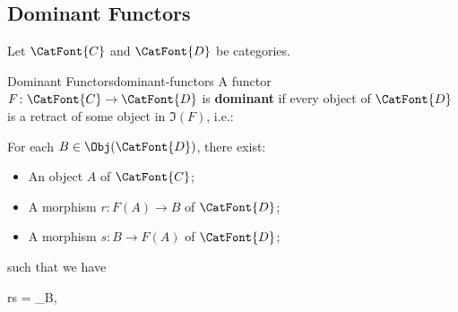 \subsection{Dominant Functors}\label{subsection-dominant-functors}
Let $\CatFont{C}$ and $\CatFont{D}$ be categories.
\begin{definition}{Dominant Functors}{dominant-functors}%
    A functor $F\colon\CatFont{C}\to\CatFont{D}$ is \textbf{dominant} if every object of $\CatFont{D}$ is a retract of some object in $\Im(F)$, i.e.:
    \begin{itemize}
        \itemstar For each $B\in\Obj(\CatFont{D})$, there exist:
            \begin{itemize}
                \item An object $A$ of $\CatFont{C}$;
                \item A morphism $r\colon F(A)\to B$ of $\CatFont{D}$;
                \item A morphism $s\colon B\to F(A)$ of $\CatFont{D}$;
            \end{itemize}
            such that we have
            \begin{webcompile}
                r\circ s%
                =%
                \id_{B},%
                \quad
            \end{webcompile}
    \end{itemize}
\end{definition}
